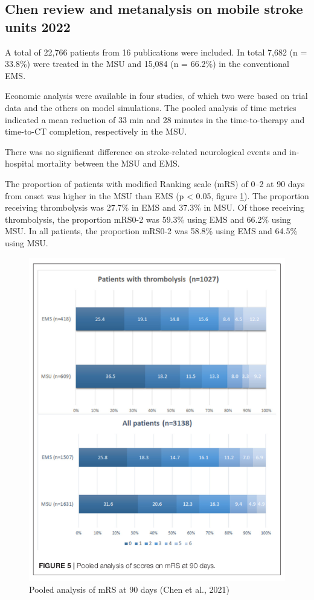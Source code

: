 
\subsection{Chen review and metanalysis on mobile stroke units 2022 \cite{chen_systematic_2022}}

A total of 22,766 patients from 16 publications were included. In total 7,682 (n = 33.8\%) were treated in the MSU and 15,084 (n = 66.2\%) in the conventional EMS.

Economic analysis were available in four studies, of which two were based on trial data and the others on model simulations. The pooled analysis of time metrics indicated a mean reduction of 33 min and 28 minutes in the time-to-therapy and time-to-CT completion, respectively in the MSU.

There was no significant difference on stroke-related neurological events and in-hospital mortality between the MSU and EMS.

The proportion of patients with modified Ranking scale (mRS) of 0–2 at 90 days from onset was higher in the MSU than EMS (p < 0.05, figure \ref{fig:background_chen_fig_5}). The proportion receiving thrombolysis was 27.7\% in EMS and 37.3\% in MSU. Of those receiving thrombolysis, the proportion mRS0-2 was 59.3\% using EMS and 66.2\% using MSU. In all patients, the proportion mRS0-2 was 58.8\% using EMS and 64.5\% using MSU.

\begin{figure}
    \centering
    \includegraphics[width=0.9\linewidth]{images_background/chen_fig_5}
    \caption{Pooled analysis of mRS at 90 days (Chen et al., 2021)}
    \label{fig:background_chen_fig_5}
\end{figure}

